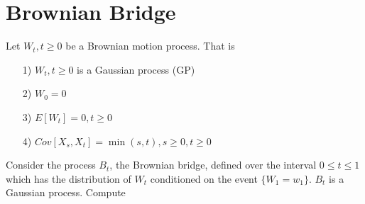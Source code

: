 \documentclass{article}[12pt]
\begin{document}
\section{Brownian Bridge}
Let $W_t, t \geq 0$ be a Brownian motion process. That is 
\begin{enumerate}
\item[1)] $W_t, t\geq 0$ is a Gaussian process (GP)
\item[2)] $W_0=0$
\item[3)] $E[W_t]=0, t \geq 0$
\item[4)] $Cov[X_s,X_t]=\min(s,t), s \geq 0, t \geq 0$
\end{enumerate}
Consider the process $B_t$, the Brownian bridge, defined over the interval $0 \leq t \leq 1$ which has the distribution of $W_t$ conditioned on the event $\{W_1=w_1\}$. $B_t$ is a Gaussian process. Compute
\end{document}
